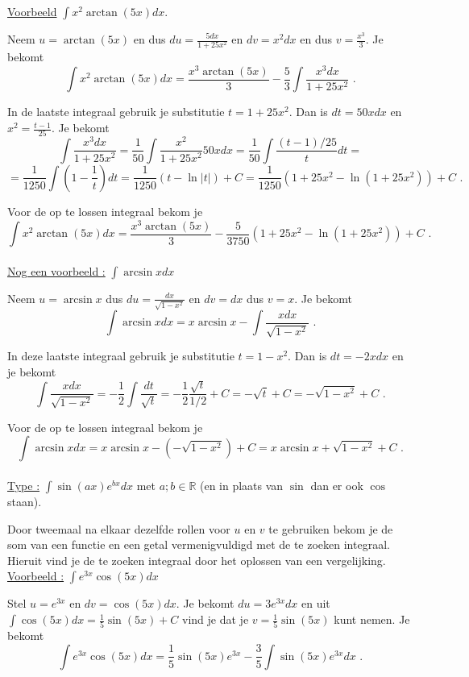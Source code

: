 \documentclass{article}
\begin{document}
\noindent \underline{Voorbeeld} $\int x^2 \arctan(5x)dx$.

Neem $u=\arctan (5x)$ en dus $du=\frac{5dx}{1+25x^2}$ en $dv=x^2dx$ en dus $v=\frac{x^3}{3}$.
Je bekomt
\[
\int x^2 \arctan(5x)dx=\frac{x^3 \arctan (5x)}{3}-\frac{5}{3} \int \frac {x^3dx}{1+25x^2} \text { .}
\]

In de laatste integraal gebruik je substitutie $t=1+25x^2$.
Dan is $dt=50xdx$ en $x^2=\frac{t-1}{25}$.
Je bekomt
\[
\int \frac {x^3dx}{1+25x^2}=\frac{1}{50}\int \frac{x^2}{1+25x^2}50xdx=\frac{1}{50}\int \frac{(t-1)/25}{t}dt=
\]
\[
=\frac{1}{1250}\int \left( 1-\frac{1}{t}  \right)dt=\frac{1}{1250}\left(  t-\ln \vert t \vert  \right)+C=\frac{1}{1250} \left( 1+25x^2-\ln \left( 1+25x^2 \right) \right)+C \text { .}
\]

Voor de op te lossen integraal bekom je
\[
\int x^2 \arctan(5x)dx=\frac{x^3 \arctan (5x)}{3}-\frac{5}{3750} \left( 1+25x^2-\ln \left( 1+25x^2 \right) \right)+C \text { .}
\]\\

\noindent \underline {Nog een voorbeeld :} $\int \arcsin x dx$

Neem $u=\arcsin x$ dus $du=\frac{dx}{\sqrt {1-x^2}}$ en $dv=dx$ dus $v=x$.
Je bekomt
\[
\int \arcsin x dx=x \arcsin x-\int \frac{xdx}{\sqrt{1-x^2}} \text { .}
\]

In deze laatste integraal gebruik je substitutie $t=1-x^2$.
Dan is $dt=-2xdx$ en je bekomt
\[
\int \frac{xdx}{\sqrt{1-x^2}}=-\frac{1}{2}\int \frac{dt}{\sqrt{t}}=-\frac{1}{2}\frac{\sqrt{t}}{1/2}+C=-\sqrt{t}+C=-\sqrt{1-x^2}+C \text { .}
\]

Voor de op te lossen integraal bekom je
\[
\int \arcsin x dx=x \arcsin x-\left( -\sqrt{1-x^2}  \right)+C=x \arcsin x+\sqrt{1-x^2} +C \text { .}
\]\\

\noindent \underline{Type :} $\int \sin (ax)e^{bx}dx$ met $a; b \in \mathbb{R}$ (en in plaats van $\sin$ dan er ook $\cos$ staan).

\noindent Door tweemaal na elkaar dezelfde rollen voor $u$ en $v$ te gebruiken bekom je de som van een functie en een getal vermenigvuldigd met de te zoeken integraal.
Hieruit vind je de te zoeken integraal door het oplossen van een vergelijking.\\

\noindent \underline{Voorbeeld :} $\int e^{3x}\cos (5x)dx$

Stel $u=e^{3x}$ en $dv=\cos (5x)dx$.
Je bekomt $du=3e^{3x}dx$ en uit $\int \cos (5x)dx=\frac{1}{5} \sin (5x)+C$ vind je dat je $v=\frac{1}{5} \sin (5x)$ kunt nemen.
Je bekomt
\[
\int e^{3x}\cos (5x)dx=\frac{1}{5}\sin (5x)e^{3x}-\frac{3}{5}\int \sin (5x)e^{3x}dx \text { .}
\]
\end{document}
